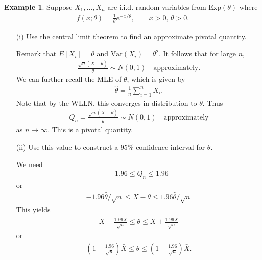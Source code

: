 \documentclass[11pt]{amsart}
\theoremstyle{definition}
\newtheorem{example}[theorem]{Example}
\numberwithin{equation}{section}
\begin{document}
\begin{example}
    Suppose $X_1,\ldots,X_n$ are i.i.d. random variables from $\mathrm{Exp}(\theta)$ where 
    \begin{align*}
        f(x;\theta)=\frac{1}{\theta}e^{-x/\theta},\qquad x>0,\,\theta>0.
    \end{align*}
    \begin{enumerate}
        \item [(i)] Use the central limit theorem to find an approximate pivotal quantity.

        Remark that $E[X_i]=\theta$ and $\mathrm{Var}(X_i)=\theta^2$. It follows that for large $n$,
        \begin{align*}
            \frac{\sqrt{n}(\bar X-\theta)}{\theta}\sim N(0,1)\quad\text{approximately.}
        \end{align*}
        We can further recall the MLE of $\theta$, which is given by
        \begin{align*}
            \hat\theta=\frac{1}{n}\sum_{i=1}^nX_i.
        \end{align*}
        Note that by the WLLN, this converges in distribution to $\theta$. Thus 
        \begin{align*}
            Q_n=\frac{\sqrt{n}(\bar X-\theta)}{\hat\theta}\sim N(0,1)\quad \text{approximately}
        \end{align*}
        as $n\to\infty$. This is a pivotal quantity.
        \item [(ii)] Use this value to construct a 95\% confidence interval for $\theta$.

        We need
        \begin{align*}
            -1.96\le Q_n\le 1.96
        \end{align*}
        or
        \begin{align*}
            -1.96\hat\theta/\sqrt{n}\le \bar X-\theta\le 1.96\hat\theta/\sqrt{n}
        \end{align*}
        This yields
        \begin{align*}
            \bar X-\frac{1.96\bar X}{\sqrt{n}}\le \theta\le\bar X+\frac{1.96\bar X}{\sqrt{n}}
        \end{align*}
        or
        \begin{align*}
            (1-\frac{1.96}{\sqrt{n}})\bar X\le\theta\le(1+\frac{1.96}{\sqrt{n}})\bar X.
        \end{align*}
    \end{enumerate}
\end{example}
\end{document}
